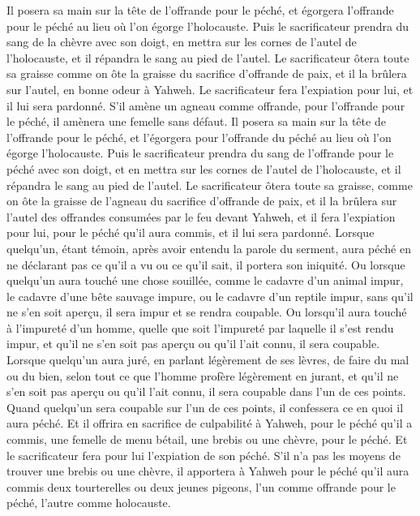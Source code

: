 \begin{multicols}{2}
Il posera sa main sur la tête de l'offrande pour le péché, et égorgera l'offrande pour le péché au lieu où l'on égorge l'holocauste.
Puis le sacrificateur prendra du sang de la chèvre avec son doigt, en mettra sur les cornes de l'autel de l'holocauste, et il répandra le sang au pied de l'autel.
Le sacrificateur ôtera toute sa graisse comme on ôte la graisse du sacrifice d’offrande de paix, et il la brûlera sur l'autel, en bonne odeur à Yahweh. Le sacrificateur fera l’expiation pour lui, et il lui sera pardonné.
S'il amène un agneau comme offrande, pour l’offrande pour le péché, il amènera une femelle sans défaut.
Il posera sa main sur la tête de l'offrande pour le péché, et l'égorgera pour l’offrande du péché au lieu où l'on égorge l'holocauste.
Puis le sacrificateur prendra du sang de l'offrande pour le péché avec son doigt, et en mettra sur les cornes de l'autel de l'holocauste, et il répandra le sang au pied de l'autel.
Le sacrificateur ôtera toute sa graisse, comme on ôte la graisse de l'agneau du sacrifice d’offrande de paix, et il la brûlera sur l'autel des offrandes consumées par le feu devant Yahweh, et il fera l’expiation pour lui, pour le péché qu'il aura commis, et il lui sera pardonné.
\VerseOne{}Lorsque quelqu’un, étant témoin, après avoir entendu la parole du serment, aura péché en ne déclarant pas ce qu’il a vu ou ce qu’il sait, il portera son iniquité.
Ou lorsque quelqu’un aura touché une chose souillée, comme le cadavre d’un animal impur, le cadavre d’une bête sauvage impure, ou le cadavre d’un reptile impur, sans qu’il ne s’en soit aperçu, il sera impur et se rendra coupable.
Ou lorsqu’il aura touché à l’impureté d'un homme, quelle que soit l’impureté par laquelle il s’est rendu impur, et qu'il ne s'en soit pas aperçu ou qu'il l'ait connu, il sera coupable.
Lorsque quelqu'un aura juré, en parlant légèrement de ses lèvres, de faire du mal ou du bien, selon tout ce que l'homme profère légèrement en jurant, et qu'il ne s'en soit pas aperçu ou qu'il l'ait connu, il sera coupable dans l'un de ces points.
Quand quelqu'un sera coupable sur l'un de ces points, il confessera ce en quoi il aura péché.
Et il offrira en sacrifice de culpabilité à Yahweh, pour le péché qu'il a commis, une femelle de menu bétail, une brebis ou une chèvre, pour le péché. Et le sacrificateur fera pour lui l’expiation de son péché.
S’il n’a pas les moyens de trouver une brebis ou une chèvre, il apportera à Yahweh pour le péché qu'il aura commis deux tourterelles ou deux jeunes pigeons, l'un comme offrande pour le péché, l'autre comme holocauste.

\end{multicols}
